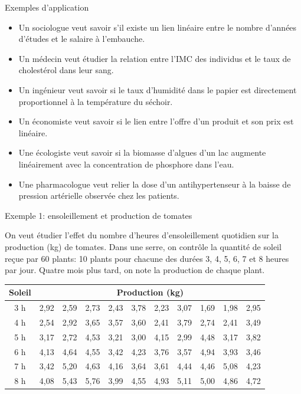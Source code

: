 \documentclass{BeamerTemplate}
\begin{document}
\begin{frame}[t]{Exemples d'application}

\begin{itemize}\itemsep2mm
  \item Un sociologue veut savoir s'il existe un lien linéaire entre le nombre
  d'années d'études et le salaire à l'embauche.
  \item<2-> Un médecin veut étudier la relation entre l'IMC des individus et le taux
  de cholestérol dans leur sang.
  \item<3-> Un ingénieur veut savoir si le taux d'humidité dans le papier est
  directement proportionnel à la température du séchoir.
  \item<4-> Un économiste veut savoir si le lien entre l'offre d'un produit et son
  prix est linéaire.
  \item<5-> Une écologiste veut savoir si la biomasse d'algues d'un lac augmente
  linéairement avec la concentration de phosphore dans l'eau.
  \item<6-> Une pharmacologue veut relier la dose d'un antihypertenseur à la baisse
  de pression artérielle observée chez les patients.
\end{itemize}

\end{frame}

\begin{frame}[t]{Exemple 1: ensoleillement et production de tomates}

On veut étudier l'effet du nombre d'heures d'\alert{ensoleillement} quotidien sur
la \alert{production} (kg) de tomates. Dans une serre, on contrôle la quantité de
soleil reçue par 60 plants: 10 plants pour chacune des durées 3, 4, 5, 6, 7 et
8 heures par jour. Quatre mois plus tard, on note la production de chaque plant.

\medskip
\begin{center}
\scriptsize
\begin{tabular}{c|cccccccccc}
\toprule
Soleil & \multicolumn{10}{c}{Production (kg)}\\
\midrule
3 h & 2,92 & 2,59 & 2,73 & 2,43 & 3,78 & 2,23 & 3,07 & 1,69 & 1,98 & 2,95\\
4 h & 2,54 & 2,92 & 3,65 & 3,57 & 3,60 & 2,41 & 3,79 & 2,74 & 2,41 & 3,49\\
5 h & 3,17 & 2,72 & 4,53 & 3,21 & 3,00 & 4,15 & 2,99 & 4,48 & 3,17 & 3,82\\
6 h & 4,13 & 4,64 & 4,55 & 3,42 & 4,23 & 3,76 & 3,57 & 4,94 & 3,93 & 3,46\\
7 h & 3,42 & 5,20 & 4,63 & 4,16 & 3,64 & 3,61 & 4,44 & 4,46 & 5,08 & 4,23\\
8 h & 4,08 & 5,43 & 5,76 & 3,99 & 4,55 & 4,93 & 5,11 & 5,00 & 4,86 & 4,72\\
\bottomrule
\end{tabular}
\end{center}

\end{frame}
\end{document}
